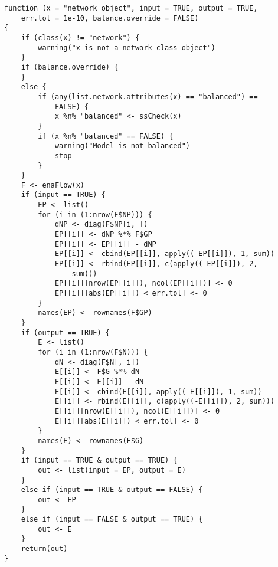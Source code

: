 \documentclass[]{article}
\begin{document}
\begin{verbatim}
function (x = "network object", input = TRUE, output = TRUE, 
    err.tol = 1e-10, balance.override = FALSE) 
{
    if (class(x) != "network") {
        warning("x is not a network class object")
    }
    if (balance.override) {
    }
    else {
        if (any(list.network.attributes(x) == "balanced") == 
            FALSE) {
            x %n% "balanced" <- ssCheck(x)
        }
        if (x %n% "balanced" == FALSE) {
            warning("Model is not balanced")
            stop
        }
    }
    F <- enaFlow(x)
    if (input == TRUE) {
        EP <- list()
        for (i in (1:nrow(F$NP))) {
            dNP <- diag(F$NP[i, ])
            EP[[i]] <- dNP %*% F$GP
            EP[[i]] <- EP[[i]] - dNP
            EP[[i]] <- cbind(EP[[i]], apply((-EP[[i]]), 1, sum))
            EP[[i]] <- rbind(EP[[i]], c(apply((-EP[[i]]), 2, 
                sum)))
            EP[[i]][nrow(EP[[i]]), ncol(EP[[i]])] <- 0
            EP[[i]][abs(EP[[i]]) < err.tol] <- 0
        }
        names(EP) <- rownames(F$GP)
    }
    if (output == TRUE) {
        E <- list()
        for (i in (1:nrow(F$N))) {
            dN <- diag(F$N[, i])
            E[[i]] <- F$G %*% dN
            E[[i]] <- E[[i]] - dN
            E[[i]] <- cbind(E[[i]], apply((-E[[i]]), 1, sum))
            E[[i]] <- rbind(E[[i]], c(apply((-E[[i]]), 2, sum)))
            E[[i]][nrow(E[[i]]), ncol(E[[i]])] <- 0
            E[[i]][abs(E[[i]]) < err.tol] <- 0
        }
        names(E) <- rownames(F$G)
    }
    if (input == TRUE & output == TRUE) {
        out <- list(input = EP, output = E)
    }
    else if (input == TRUE & output == FALSE) {
        out <- EP
    }
    else if (input == FALSE & output == TRUE) {
        out <- E
    }
    return(out)
}
\end{verbatim}
\end{document}
